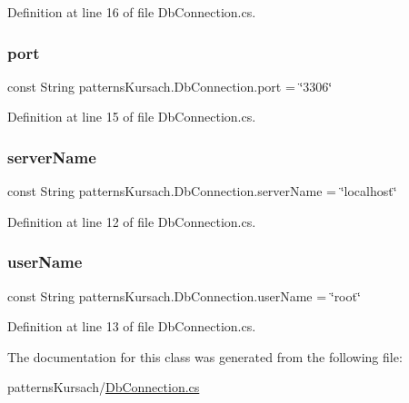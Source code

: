 Definition at line 16 of file Db\+Connection.\+cs.

\mbox{\label{classpatterns_kursach_1_1_db_connection_a320a0f64312ebe973e6bedbd4643ae40}} 
\subsubsection{\texorpdfstring{port}{port}}
{\footnotesize\ttfamily const String patterns\+Kursach.\+Db\+Connection.\+port = \char`\"{}3306\char`\"{}}



Definition at line 15 of file Db\+Connection.\+cs.

\mbox{\label{classpatterns_kursach_1_1_db_connection_a3d3e6dbf6c6e37527a5a6885fc9f2a3a}} 
\subsubsection{\texorpdfstring{server\+Name}{serverName}}
{\footnotesize\ttfamily const String patterns\+Kursach.\+Db\+Connection.\+server\+Name = \char`\"{}localhost\char`\"{}}



Definition at line 12 of file Db\+Connection.\+cs.

\mbox{\label{classpatterns_kursach_1_1_db_connection_a7d457ab2278b176330c807719ab43b17}} 
\subsubsection{\texorpdfstring{user\+Name}{userName}}
{\footnotesize\ttfamily const String patterns\+Kursach.\+Db\+Connection.\+user\+Name = \char`\"{}root\char`\"{}}



Definition at line 13 of file Db\+Connection.\+cs.



The documentation for this class was generated from the following file\+:\begin{DoxyCompactItemize}
\item 
patterns\+Kursach/\mbox{\hyperlink{_db_connection_8cs}{Db\+Connection.\+cs}}\end{DoxyCompactItemize}

